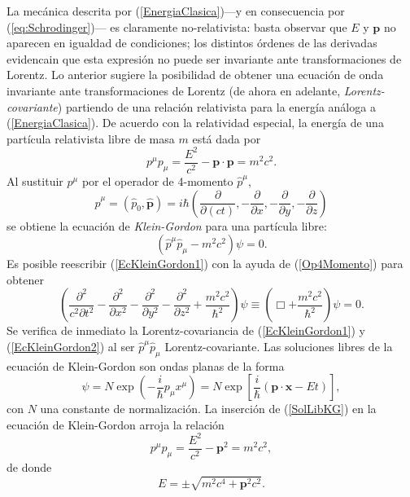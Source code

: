La mecánica descrita por (\ref{EnergiaClasica})---y en consecuencia por (\ref{eq:Schrodinger})--- es claramente no-relativista: basta observar que $E$ y $\mathbf{p}$ no aparecen en igualdad de condiciones; los distintos órdenes de las derivadas evidencain que esta expresión no puede ser invariante ante transformaciones de Lorentz. Lo anterior sugiere la posibilidad de obtener una ecuación de onda invariante ante transformaciones de Lorentz (de ahora en adelante, \textit{Lorentz-covariante}) partiendo de una relación relativista para la energía análoga a (\ref{EnergiaClasica}). De acuerdo con la relatividad especial, la energía de una partícula relativista libre de masa $m$ está dada por
\begin{equation}\label{EnergiaRel}
p^{\mu} p_{\mu} =\frac{E^2}{c^2}-\mathbf{p}\cdot\mathbf{p}=m^2c^2.
\end{equation}
Al sustituir $p^\mu$ por el operador de 4-momento $\hat{p}^\mu$,
\begin{equation}\label{Op4Momento}
\hat{p}^\mu =\left(\hat{p}_0,\hat{\mathbf{p}} \right)=
i\hbar\left( \dfrac{\partial}{\partial(ct)},-\dfrac{\partial}{\partial x},-\dfrac{\partial}{\partial y},-\dfrac{\partial}{\partial z} \right)
\end{equation}
se obtiene la ecuación de \textit{Klein-Gordon} para una partícula libre:
\begin{equation}\label{EcKleinGordon1}
\left( \hat{p}^\mu \hat{p}_\mu -m^2c^2\right)\psi=0.
\end{equation}
Es posible reescribir (\ref{EcKleinGordon1}) con la ayuda de (\ref{Op4Momento}) para obtener
\begin{equation}\label{EcKleinGordon2}
\left( \frac{\partial^2}{c^2 \partial t^2} -\frac{\partial^2}{\partial x^2}-\frac{\partial^2}{\partial y^2}-\frac{\partial^2}{\partial z^2}+\frac{m^2c^2}{\hbar^2} \right)\psi \equiv \left( \Box+\frac{m^2 c^2}{\hbar^2}\right) \psi=0.
\end{equation}
Se verifica de inmediato la Lorentz-covariancia de (\ref{EcKleinGordon1}) y (\ref{EcKleinGordon2}) al ser $\hat{p}^\mu\hat{p}_\mu$ Lorentz-covariante. 
Las soluciones libres de la ecuación de Klein-Gordon son ondas planas de la forma
\begin{equation}\label{SolLibKG}
\psi=N\exp{\left( -\frac{i}{\hbar}p_\mu x^\mu\right)}=N\exp{\left[ \frac{i}{\hbar}(\mathbf{p}\cdot \mathbf{x}-Et)\right]},
\end{equation}
con $N$ una constante de normalización. La inserción de (\ref{SolLibKG}) en la ecuación de Klein-Gordon arroja la relación
\begin{equation*}
p^{\mu}p_{\mu}=\frac{E^2}{c^2}-\mathbf{p}^2=m^2c^2, 
\end{equation*}
de donde
\begin{equation}\label{EnergiaKG}
 E=\pm \sqrt{m^2 c^4+\mathbf{p}^2c^2}.
\end{equation}

